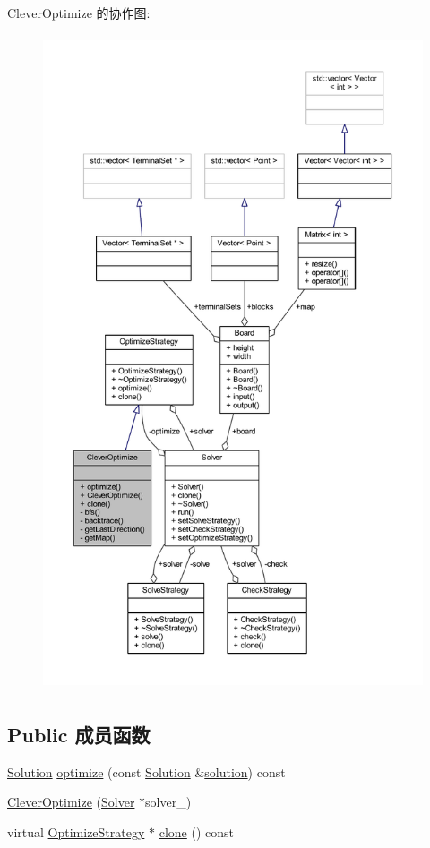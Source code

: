 Clever\+Optimize 的协作图\+:
\nopagebreak
\begin{figure}[H]
\begin{center}
\leavevmode
\includegraphics[height=550pt]{classCleverOptimize__coll__graph}
\end{center}
\end{figure}
\subsection*{Public 成员函数}
\begin{DoxyCompactItemize}
\item 
\hyperlink{classSolution}{Solution} \hyperlink{classCleverOptimize_ab3cc46af7f8e30d264c2f737870ab9e6}{optimize} (const \hyperlink{classSolution}{Solution} \&\hyperlink{classes_8txt_aa43d5190bbc491d9c9134146e01a248e}{solution}) const 
\item 
\hyperlink{classCleverOptimize_a84307b644b9fafa57d21042e02e9cdd3}{Clever\+Optimize} (\hyperlink{classSolver}{Solver} $\ast$solver\+\_\+)
\item 
virtual \hyperlink{classOptimizeStrategy}{Optimize\+Strategy} $\ast$ \hyperlink{classCleverOptimize_a64e5717a9e8090ccf6aecd185fbc9054}{clone} () const 
\end{DoxyCompactItemize}
